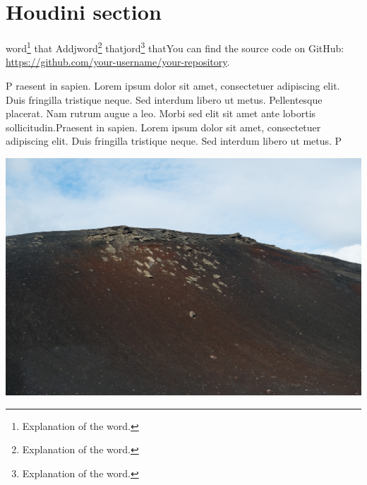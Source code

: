 

\section*{Houdini section}



word\footnote{Explanation of the word.} that Addjword\footnote{Explanation of the word.} thatjord\footnote{Explanation of the word.} thatYou can find the source code on GitHub: \url{https://github.com/your-username/your-repository}.



P
raesent in sapien. Lorem ipsum dolor sit amet, consectetuer adipiscing elit.
Duis fringilla tristique neque. Sed interdum libero ut metus. Pellentesque
placerat. Nam rutrum augue a leo. Morbi sed elit sit amet ante lobortis
sollicitudin.Praesent in sapien. Lorem ipsum dolor sit amet, consectetuer
adipiscing elit. Duis fringilla tristique neque. Sed interdum libero ut metus.
P

\begin{multicols}{2} %
    \lipsum[1] %
 \noindent   \includegraphics[width=\linewidth]{sections/assignment_1/t.png} %
    \lipsum[1-4] %
\end{multicols}

